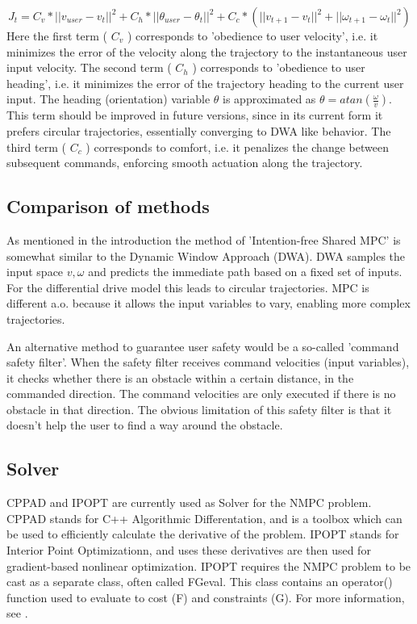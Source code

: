 \documentclass[a4paper,10pt]{article}
\begin{document}
\[ J_t = C_v * ||v_{user} - v_t||^2 + C_h * ||\theta_{user} - \theta_t||^2 + C_c * (||v_{t+1}-v_t||^2 + ||\omega_{t+1} - \omega_t||^2) \]
Here the first term ( \( C_v \) ) corresponds to 'obedience to user  velocity', i.e. it minimizes the error of the velocity along the trajectory to the instantaneous user input velocity. 
The second term ( \( C_h \) ) corresponds to 'obedience to user heading', i.e. it minimizes the error of the trajectory heading to the current user input. The heading (orientation) variable \( \theta \) is approximated as \( \theta = atan(\frac{\omega}{v}) \). This term should be improved in future versions, since in its current form it prefers circular trajectories, essentially converging to DWA like behavior. 
The third term ( \( C_c \) )  corresponds to comfort, i.e. it penalizes the change between subsequent commands, enforcing smooth actuation along the trajectory. 


\subsection{Comparison of methods}
As mentioned in the introduction the method of 'Intention-free Shared MPC' is somewhat similar to the Dynamic Window Approach (DWA). 
DWA samples the input space \(v, \omega \) and predicts the immediate path based on a fixed set of inputs. For the differential drive model this leads to circular trajectories. 
MPC is different a.o. because it allows the input variables to vary, enabling more complex trajectories. 

An alternative method to guarantee user safety would be a so-called 'command safety filter'. When the safety filter receives command velocities (input variables), it checks whether there is an obstacle within a certain distance, in the commanded direction. The command velocities are only executed if there is no obstacle in that direction. 
The obvious limitation of this safety filter is that it doesn't help the user to find a way around the obstacle. 

\subsection{Solver}

CPPAD and IPOPT are currently used as Solver for the NMPC problem. 
CPPAD stands for C++ Algorithmic Differentation, and is a toolbox which can be used to efficiently calculate the derivative of the problem.
IPOPT stands for Interior Point Optimizationn, and uses these derivatives are then used for gradient-based nonlinear optimization. 
IPOPT requires the NMPC problem to be cast as a separate class, often called FGeval. This class contains an operator() function used to evaluate to cost (F) and constraints (G).
For more information, see \cite{cppad}.
\end{document}
